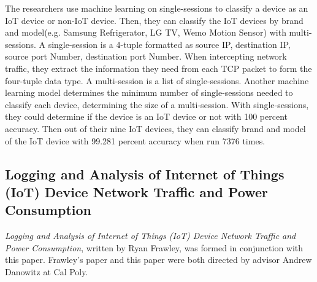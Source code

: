 The researchers use machine learning on single-sessions to classify a device as an IoT device or non-IoT device. Then, they can classify the IoT devices by brand and model(e.g. Samsung Refrigerator, LG TV, Wemo Motion Sensor) with multi-sessions. A single-session is a 4-tuple formatted as source IP, destination IP, source port Number, destination port Number. When intercepting network traffic, they extract the information they need from each TCP packet to form the four-tuple data type. A multi-session is a list of single-sessions. Another machine learning model determines the minimum number of single-sessions needed to classify each device, determining the size of a multi-session. With single-sessions, they could determine if the device is an IoT device or not with 100 percent accuracy. Then out of their nine IoT devices, they can classify brand and model of the IoT device with 99.281 percent accuracy when run 7376 times.


\subsection{Logging and Analysis of Internet of Things (IoT) Device Network Traffic and Power Consumption}
\label{frawleyPaper}
\textit{Logging and Analysis of Internet of Things (IoT) Device Network Traffic and Power Consumption}\cite{frawley_2018}, written by Ryan Frawley, was formed in conjunction with this paper. Frawley's paper and this paper were both directed by advisor Andrew Danowitz at Cal Poly.

